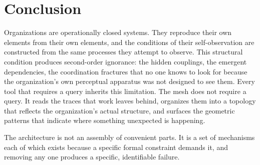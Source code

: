 \documentclass[11pt,a4paper]{article}
\begin{document}
\section{Conclusion}
\label{sec:conclusion}

Organizations are operationally closed systems. They reproduce their own elements from their own elements, and the conditions of their self-observation are constructed from the same processes they attempt to observe. This structural condition produces second-order ignorance: the hidden couplings, the emergent dependencies, the coordination fractures that no one knows to look for because the organization's own perceptual apparatus was not designed to see them. Every tool that requires a query inherits this limitation. The mesh does not require a query. It reads the traces that work leaves behind, organizes them into a topology that reflects the organization's actual structure, and surfaces the geometric patterns that indicate where something unexpected is happening.

The architecture is not an assembly of convenient parts. It is a set of mechanisms each of which exists because a specific formal constraint demands it, and removing any one produces a specific, identifiable failure.
\end{document}
